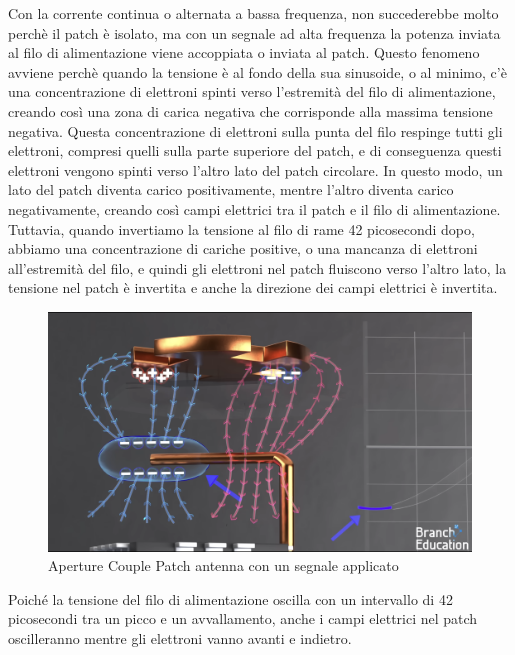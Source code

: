 Con la corrente continua o alternata a bassa frequenza, non succederebbe molto perchè il patch è isolato, ma con un segnale ad alta frequenza la potenza inviata al filo di alimentazione viene accoppiata o inviata al patch.
Questo fenomeno avviene perchè quando la tensione è al fondo della sua sinusoide, o al minimo, c'è una concentrazione di elettroni spinti verso l'estremità del filo di alimentazione, creando così una zona di carica negativa che corrisponde alla massima tensione negativa.
Questa concentrazione di elettroni sulla punta del filo respinge tutti gli elettroni, compresi quelli sulla parte superiore del patch, e di conseguenza questi elettroni vengono spinti verso l'altro lato del patch circolare.
In questo modo, un lato del patch diventa carico positivamente, mentre l'altro diventa carico negativamente, creando così campi elettrici tra il patch e il filo di alimentazione.
Tuttavia, quando invertiamo la tensione al filo di rame 42 picosecondi dopo, abbiamo una concentrazione di cariche positive, o una mancanza di elettroni all'estremità del filo, e quindi gli elettroni nel patch fluiscono verso l'altro lato, la tensione nel patch è invertita e anche la direzione dei campi elettrici è invertita.

\begin{figure}[htbp]
  \centering
  \includegraphics[width=0.8\linewidth]{./res/img/antenna_voltage_applied.png}
  \caption{Aperture Couple Patch antenna con un segnale applicato \cite{branch_education_how_2022}}
  \label{fig:aperture-couple-patch-antenna-voltage-applied}
\end{figure}

Poiché la tensione del filo di alimentazione oscilla con un intervallo di 42 picosecondi tra un picco e un avvallamento, anche i campi elettrici nel patch oscilleranno mentre gli elettroni vanno avanti e indietro.

